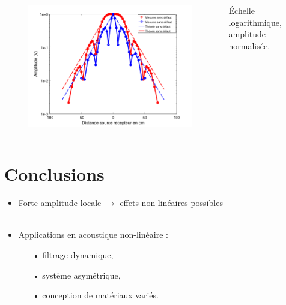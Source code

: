 \documentclass[12pt,xcolor=x11names,compress, notes=show]{beamer}%
\begin{document}
\begin{frame}{\insertsectionhead}
\begin{columns}[T]
	\begin{figure}
		\centering
		\includegraphics[height=0.5\textheight]{comparaison_decroissance_log_theo.png}
	\end{figure}
	\centering
	\vspace{-0.2cm}
	\footnotesize{Échelle logarithmique, amplitude normalisée.}
\end{columns}
\end{frame}


\section*{Conclusions}
\begin{frame}{\insertsectionhead}

\begin{itemize}
	\item Forte amplitude locale $\rightarrow$ effets non-linéaires possibles\\~\\
	\item Applications en acoustique non-linéaire : 
		\begin{itemize}
			\item[•] filtrage dynamique,
			\item[•] système asymétrique, 
			\item[•] conception de matériaux variés.
		\end{itemize}
\end{itemize}

	
\end{frame}
\end{document}
